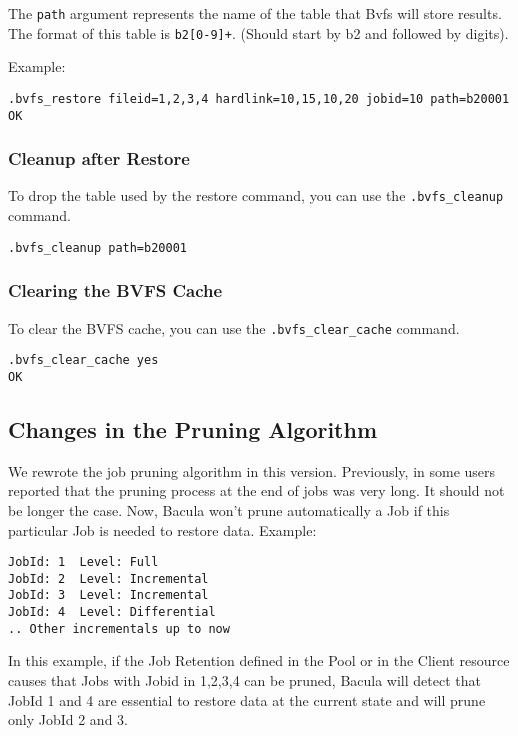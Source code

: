 The \texttt{path} argument represents the name of the table that Bvfs will
store results. The format of this table is \texttt{b2[0-9]+}. (Should start by
b2 and followed by digits).

Example:

\begin{verbatim}
.bvfs_restore fileid=1,2,3,4 hardlink=10,15,10,20 jobid=10 path=b20001
OK
\end{verbatim}

\subsubsection*{Cleanup after Restore}

To drop the table used by the restore command, you can use the
\texttt{.bvfs\_cleanup} command.

\begin{verbatim}
.bvfs_cleanup path=b20001
\end{verbatim}

\subsubsection*{Clearing the BVFS Cache}

To clear the BVFS cache, you can use the \texttt{.bvfs\_clear\_cache} command.

\begin{verbatim}
.bvfs_clear_cache yes
OK
\end{verbatim}

\subsection{Changes in the Pruning Algorithm}

We rewrote the job pruning algorithm in this version. Previously, in some users
reported that the pruning process at the end of jobs was very long. It should
not be longer the case. Now, Bacula won't prune automatically a Job if this
particular Job is needed to restore data. Example:

\begin{verbatim}
JobId: 1  Level: Full
JobId: 2  Level: Incremental
JobId: 3  Level: Incremental
JobId: 4  Level: Differential
.. Other incrementals up to now
\end{verbatim}

In this example, if the Job Retention defined in the Pool or in the Client
resource causes that Jobs with Jobid in 1,2,3,4 can be pruned, Bacula will
detect that JobId 1 and 4 are essential to restore data at the current state
and will prune only JobId 2 and 3.

